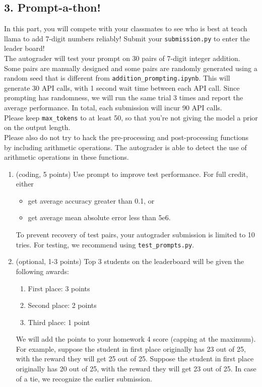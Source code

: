 \documentclass{article}
\theoremstyle{case}
\theoremstyle{definition}
\begin{document}
\newpage
\subsection*{3. Prompt-a-thon!}

In this part, you will compete with your classmates to see who is best at teach llama to add 7-digit numbers reliably! Submit your \texttt{submission.py} to enter the leader board!\\

The autograder will test your prompt on 30 pairs of 7-digit integer addition. Some pairs are manually designed and some pairs are randomly generated using a random seed that is different from \texttt{addition\_prompting.ipynb}. This will generate 30 API calls, with 1 second wait time between each API call. Since prompting has randomness, we will run the same trial 3 times and report the average performance. In total, each submission will incur 90 API calls. \\

Please keep \texttt{max\_tokens} to at least 50, so that you're not giving the model a prior on the output length. \\ Please also do not try to hack the pre-processing and post-processing functions by including arithmetic operations. The autograder is able to detect the use of arithmetic operations in these functions.

\begin{enumerate}[label=\alph*.]
    \item (coding, 5 points) Use prompt to improve test performance. For full credit, either
    \begin{itemize}
        \item get average accuracy greater than 0.1, or
        \item get average mean absolute error less than 5e6.
    \end{itemize}
    To prevent recovery of test pairs, your autograder submission is limited to 10 tries. For testing, we recommend using \texttt{test\_prompts.py}.
    \item (optional, 1-3 points)
    Top 3 students on the leaderboard will be given the following awards:
    \begin{enumerate}
        \item First place: 3 points
        \item Second place: 2 points
        \item Third place: 1 point
    \end{enumerate}
    We will add the points to your homework 4 score (capping at the maximum). For example, suppose the student in first place originally has 23 out of 25, with the reward they will get 25 out of 25. Suppose the student in first place originally has 20 out of 25, with the reward they will get 23 out of 25. In case of a tie, we recognize the earlier submission.
\end{enumerate}
\end{document}
